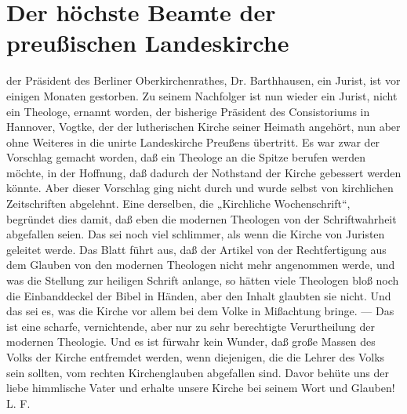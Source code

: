 \chapter[Höchster Beamter der Landeskirche]{Der höchste Beamte der preußischen Landeskirche}
der Präsident des Berliner Oberkirchenrathes, Dr. Barthhausen, ein Jurist, ist vor einigen Monaten gestorben. Zu seinem Nachfolger ist nun wieder ein Jurist, nicht ein Theologe, ernannt worden, der bisherige Präsident des Consistoriums in Hannover, Vogtke, der der lutherischen Kirche seiner Heimath angehört, nun aber ohne Weiteres in die unirte Landeskirche Preußens übertritt. Es war zwar der Vorschlag gemacht worden, daß ein Theologe an die Spitze berufen werden möchte, in der Hoffnung, daß dadurch der Nothstand der Kirche gebessert werden könnte. Aber dieser Vorschlag ging nicht durch und wurde selbst von kirchlichen Zeitschriften abgelehnt. Eine derselben, die „Kirchliche Wochenschrift“, begründet dies damit, daß eben die modernen Theologen von der Schriftwahrheit abgefallen seien. Das sei noch viel schlimmer, als wenn die Kirche von Juristen geleitet werde. Das Blatt führt aus, daß der Artikel von der Rechtfertigung aus dem Glauben von den modernen Theologen nicht mehr angenommen werde, und was die Stellung zur heiligen Schrift anlange, so hätten viele Theologen bloß noch die Einbanddeckel der Bibel in Händen, aber den Inhalt glaubten sie nicht. Und das sei es, was die Kirche vor allem bei dem Volke in Mißachtung bringe. — Das ist eine scharfe, vernichtende, aber nur zu sehr berechtigte Verurtheilung der modernen Theologie. Und es ist fürwahr kein Wunder, daß große Massen des Volks der Kirche entfremdet werden, wenn diejenigen, die die Lehrer des Volks sein sollten, vom rechten Kirchenglauben abgefallen sind. Davor behüte uns der liebe himmlische Vater und erhalte unsere Kirche bei seinem Wort und Glauben! L. F.
